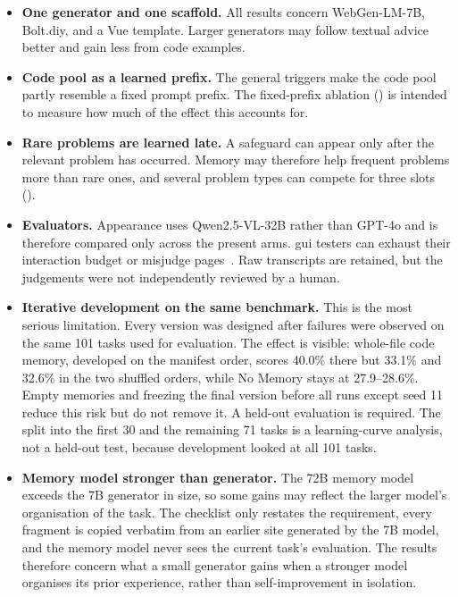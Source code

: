 \begin{itemize}
  \item \textbf{One generator and one scaffold.} All results concern WebGen-LM-7B, Bolt.diy, and a Vue template. Larger generators may follow textual advice better and gain less from code examples.
  \item \textbf{Code pool as a learned prefix.} The general triggers make the code pool partly resemble a fixed prompt prefix. The fixed-prefix ablation () is intended to measure how much of the effect this accounts for.
  \item \textbf{Rare problems are learned late.} A safeguard can appear only after the relevant problem has occurred. Memory may therefore help frequent problems more than rare ones, and several problem types can compete for three slots ().
  \item \textbf{Evaluators.} Appearance uses Qwen2.5-VL-32B rather than GPT-4o and is therefore compared only across the present arms. \gls{gui} testers can exhaust their interaction budget or misjudge pages~\cite{zheng2023judge}. Raw transcripts are retained, but the judgements were not independently reviewed by a human.
  \item \textbf{Iterative development on the same benchmark.} This is the most serious limitation. Every version was designed after failures were observed on the same 101 tasks used for evaluation. The effect is visible: whole-file code memory, developed on the manifest order, scores 40.0\% there but 33.1\% and 32.6\% in the two shuffled orders, while No Memory stays at 27.9--28.6\%. Empty memories and freezing the final version before all runs except seed 11 reduce this risk but do not remove it. A held-out evaluation is required. The split into the first 30 and the remaining 71 tasks is a learning-curve analysis, not a held-out test, because development looked at all 101 tasks.
  \item \textbf{Memory model stronger than generator.} The 72B memory model exceeds the 7B generator in size, so some gains may reflect the larger model's organisation of the task. The checklist only restates the requirement, every fragment is copied verbatim from an earlier site generated by the 7B model, and the memory model never sees the current task's evaluation. The results therefore concern what a small generator gains when a stronger model organises its prior experience, rather than self-improvement in isolation. 
\end{itemize}

